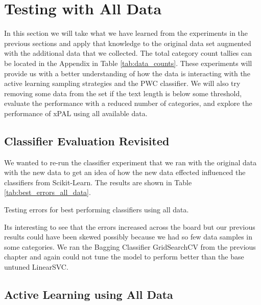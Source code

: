 \chapter{Testing with All Data}
\label{sec:proper_vectorization}

In this section we will take what we have learned from the experiments in the previous sections and apply that knowledge to the original data set augmented with the additional data that we collected. The total category count tallies can be located in the Appendix in Table \ref{tab:data_counts}. These experiments will provide us with a better understanding of how the data is interacting with the active learning sampling strategies and the PWC classifier. We will also try removing some data from the set if the text length is below some threshold, evaluate the performance with a reduced number of categories, and explore the performance of xPAL using all available data.

\section{Classifier Evaluation Revisited}

We wanted to re-run the classifier experiment that we ran with the original data with the new data to get an idea of how the new data effected influenced the classifiers from Scikit-Learn. The results are shown in Table \ref{tab:best_errors_all_data}.

\begin{table}[ht]
    \centering
    \caption{Testing errors for best performing classifiers using all data.}
    
    \label{tab:best_errors_all_data}
\end{table}

Its interesting to see that the errors increased across the board but our previous results could have been skewed possibly because we had so few data samples in some categories. We ran the Bagging Classifier GridSearchCV from the previous chapter and again could not tune the model to perform better than the base untuned LinearSVC.

\section{Active Learning using All Data}

